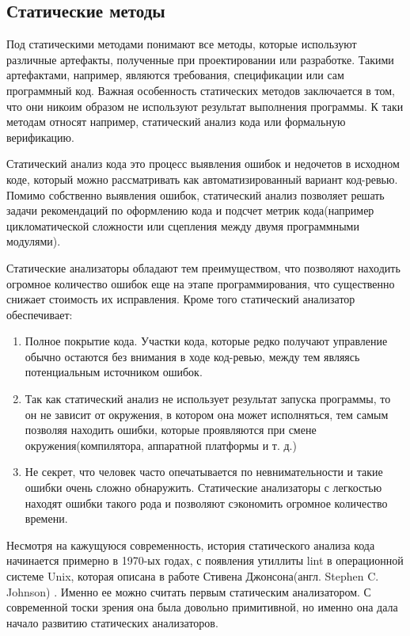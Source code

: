 \subsection{Статические методы}

Под статическими методами понимают все методы, которые используют различные артефакты, полученные при проектировании или разработке. Такими артефактами, например, являются требования, спецификации или сам программный код. Важная особенность статических методов заключается в том, что они никоим образом не используют результат выполнения программы. К таки методам относят например, статический анализ кода или формальную верификацию.

Статический анализ кода это процесс выявления ошибок и недочетов в исходном коде, который можно рассматривать как автоматизированный вариант код-ревью. Помимо собственно выявления ошибок, статический анализ позволяет решать задачи рекомендаций по оформлению кода и подсчет метрик кода(например цикломатической сложности или сцепления между двумя программными модулями).

Статические анализаторы обладают тем преимуществом, что позволяют находить огромное количество ошибок еще на этапе программирования, что существенно снижает стоимость их исправления. Кроме того статический анализатор обеспечивает:

\begin{enumerate}
  \item Полное покрытие кода. Участки кода, которые редко получают управление обычно остаются без внимания в ходе код-ревью, между тем являясь потенциальным источником ошибок.
  \item Так как статический анализ не использует результат запуска программы, то он не зависит от окружения, в котором она может исполняться, тем самым позволяя находить ошибки, которые проявляются при смене окружения(компилятора, аппаратной платформы и т. д.)
  \item Не секрет, что человек часто опечатывается по невнимательности и такие ошибки очень сложно обнаружить. Статические анализаторы с легкостью находят ошибки такого рода и позволяют сэкономить огромное количество времени.
\end{enumerate}

Несмотря на кажущуюся современность, история статического анализа кода начинается примерно в 1970-ых годах, с появления утиллиты lint в операционной системе Unix, которая описана в работе Стивена Джонсона(англ. Stephen C. Johnson) \cite{Johnson78lint}. Именно ее можно считать первым статическим анализатором. С современной тоски зрения она была довольно примитивной, но именно она дала начало развитию статических анализаторов.

